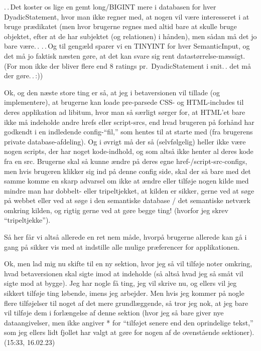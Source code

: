 \documentclass{report}
\begin{document}
.\,.\,Det koster os lige en gemt long/BIGINT mere i databasen for hver DyadicStatement, hvor man ikke regner med, at nogen vil være interesseret i at bruge prædikatet (men hvor brugerne regnes med altid bare at skulle bruge objektet, efter at de har subjektet (og relationen) i hånden), men sådan må det jo bare være.\,. .\,.\,Og til gengæld sparer vi en TINYINT for hver SemanticInput, og det må jo faktisk næsten gøre, at det kan svare sig rent datastørrelse-mæssigt. (For mon ikke der bliver flere end 8 ratings pr.\ DyadicStatement i snit.\,. det må der gøre.\,.\,:)) 

Ok, og den næste store ting er så, at jeg i betaversionen vil tillade (og implementere), at brugerne kan loade pre-parsede CSS- og HTML-includes til deres applikation ad libitum, hvor man så særligt sørger for, at HTML'et bare ikke må indeholde andre hrefs eller script-srcs, end hvad brugeren på forhånd har godkendt i en indledende config-``fil,'' som hentes til at starte med (fra brugerens private database-afdeling). Og i øvrigt må der så (selvfølgelig) heller ikke være nogen scripts, der har noget kode-indhold, og som altså ikke henter al deres kode fra en src. Brugerne skal så kunne ændre på deres egne href-/script-src-configs, men hvis brugeren klikker sig ind på denne config side, skal der så bare med det samme komme en skarp advarsel om ikke at ændre eller tilføje nogen kilde med mindre man har dobbelt- eller tripeltjekket, at kilden er sikker, gerne ved at søge på webbet eller ved at søge i den semantiske database / det semantiske netværk omkring kilden, og rigtig gerne ved at gøre begge ting! (hvorfor jeg skrev ``tripeltjekke''). 

Så her får vi altså allerede en ret nem måde, hvorpå brugerne allerede kan gå i gang på sikker vis med at indstille alle mulige præferencer for applikationen. 

Ok, men lad mig nu skifte til en ny sektion, hvor jeg så vil tilføje noter omkring, hvad betaversionen skal sigte imod at indeholde (så altså hvad jeg så småt vil sigte mod at bygge). Jeg har nogle få ting, jeg vil skrive nu, og ellers vil jeg sikkert tilføje ting løbende, imens jeg arbejder. Men hvis jeg kommer på nogle flere tilføjelser til noget af det mere grundlæggende, så tror jeg nok, at jeg bare vil tilføje dem i forlængelse af denne sektion (hvor jeg så bare giver nye dataangivelser, men ikke angiver * for ``tilføjet senere end den oprindelige tekst,'' som jeg ellers lidt fjollet har valgt at gøre for nogen af de ovenstående sektioner). (15:33, 16.02.23)
\end{document}
